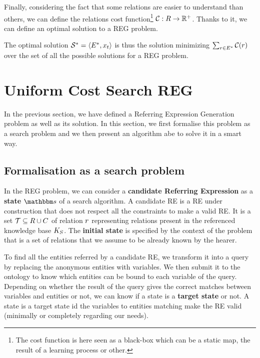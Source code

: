Finally, considering the fact that some relations are easier to understand than others, we can define the relations cost function\footnote{The cost function is here seen as a black-box which can be a static map, the result of a learning process or other.} $\mathcal{C} : R \rightarrow \mathbb{R}^+$. Thanks to it, we can define an optimal solution to a REG problem.

\begin{definition}
The optimal solution $\mathcal{S}^* = \langle E^*, x_t \rangle$ is thus the solution minimizing $\sum_{r \in E^*} \mathcal{C}(r)$ over the set of all the possible solutions for a REG problem.
\end{definition}



\section{Uniform Cost Search REG}

In the previous section, we have defined a Referring Expression Generation problem as well as its solution. In this section, we first formalise this problem as a search problem and we then present an algorithm abe to solve it in a smart way.

\subsection{Formalisation as a search problem}

In the REG problem, we can consider a \textbf{candidate Referring Expression} as a \textbf{state} $\state$ of a search algorithm. A candidate RE is a RE under construction that does not respect all the constraints to make a valid RE. It is a set $\mathcal{T} \subseteq R \cup C$ of relation $r$ representing relations present in the referenced knowledge base $K_S$. The \textbf{initial state} is specified by the context of the problem that is a set of relations that we assume to be already known by the hearer.

To find all the entities referred by a candidate RE, we transform it into a \sparql{} query by replacing the anonymous entities with variables. We then submit it to the ontology to know which entities can be bound to each variable of the query. Depending on whether the result of the query gives the correct matches between variables and entities or not, we can know if a state is a \textbf{target state} or not. A state is a target state id the variables to entities matching make the RE valid (minimally or completely regarding our needs).

